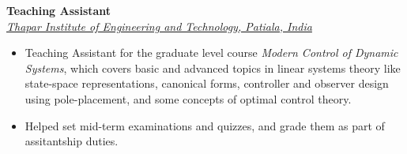 	\large{\textbf{Teaching Assistant}}
	\hfill
	\thapardate\\
	\href{https://www.thapar.edu/}{\large{\emph{Thapar Institute of Engineering and Technology, Patiala, India}}}
	\begin{itemize}
		\item Teaching Assistant for the graduate level course \emph{Modern Control of Dynamic Systems}, which covers basic and advanced topics in linear systems theory like state-space representations, canonical forms, controller and observer design using pole-placement, and some concepts of optimal control theory.
		\item Helped set mid-term examinations and quizzes, and grade them as part of assitantship duties.
	\end{itemize}
\fi




